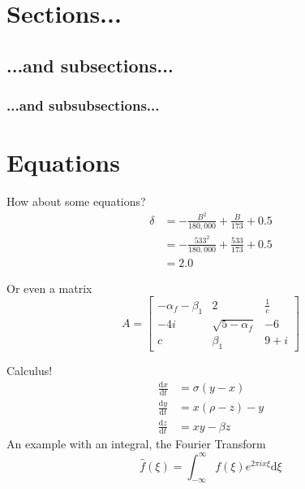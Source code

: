 \documentclass[hidelinks, 12pt]{article}%
\begin{document}
    \section{Sections...}
        \subsection{...and subsections...}
            \subsubsection{...and subsubsections...}

    \section{Equations}
        How about some equations?
        \begin{align}
            \delta & = - \frac{B^{2}}{180,000} + \frac{B}{173} + 0.5\nonumber      \\
                   & = - \frac{533^{2}}{180,000} + \frac{533}{173} + 0.5 \nonumber \\
                   & = 2.0 \nonumber
        \end{align}

        Or even a matrix
        \begin{equation*}
            A =
            \begin{bmatrix}
                -\alpha_f-\beta_1 & 2                 & \frac{1}{c} \\
                -4i               & \sqrt{5-\alpha_f} & -6          \\
                c                 & \beta_1           & 9 + i
            \end{bmatrix}
        \end{equation*}

        Calculus!
        \begin{align}
            \frac{\text{d}x}{\text{d}t} &= \sigma (y-x)\\
            \frac{\text{d}y}{\text{d}t} &= x(\rho -z)-y\\
            \frac{\text{d}z}{\text{d}t} &= xy-\beta z
        \end{align}
        An example with an integral, the Fourier Transform
        \begin{equation}
            \hat{f}\left(\xi\right) = \int_{-\infty}^{\infty}f\left(\xi\right)e^{2\pi ix\xi}\text{d}\xi
            \label{eqt:fourTrans}
        \end{equation}
\end{document}
